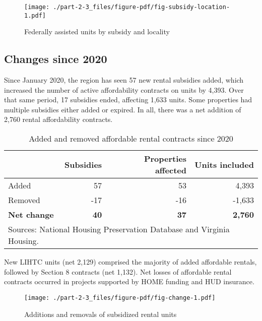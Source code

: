 \documentclass[
  letterpaper,
  DIV=11,
  numbers=noendperiod]{scrreprt}
\begin{document}
\begin{figure}

{\centering \texttt{[image: ./part-2-3\_files/figure-pdf/fig-subsidy-location-1.pdf]}

}

\caption{\label{fig-subsidy-location}Federally assisted units by subsidy
and locality}

\end{figure}

\hypertarget{changes-since-2020}{%
\subsection{Changes since 2020}\label{changes-since-2020}}

Since January 2020, the region has seen 57 new rental subsidies added,
which increased the number of active affordability contracts on units by
4,393. Over that same period, 17 subsidies ended, affecting 1,633 units.
Some properties had multiple subsidies either added or expired. In all,
there was a net addition of 2,760 rental affordability contracts.

\hypertarget{tbl-change}{}
\begin{table}
\caption{\label{tbl-change}Added and removed affordable rental contracts since 2020 }\tabularnewline

\centering
\begin{tabular}{l|r|r|r}
\hline
 & Subsidies & Properties affected & Units included\\
\hline
Added & 57 & 53 & 4,393\\
\hline
Removed & -17 & -16 & -1,633\\
\hline
\textbf{Net change} & \textbf{40} & \textbf{37} & \textbf{2,760}\\
\hline
\multicolumn{4}{l}{\rule{0pt}{1em}Sources: National Housing Preservation Database and Virginia Housing.}\\
\end{tabular}
\end{table}

New LIHTC units (net 2,129) comprised the majority of added affordable
rentals, followed by Section 8 contracts (net 1,132). Net losses of
affordable rental contracts occurred in projects supported by HOME
funding and HUD insurance.

\begin{figure}

{\centering \texttt{[image: ./part-2-3\_files/figure-pdf/fig-change-1.pdf]}

}

\caption{\label{fig-change}Additions and removals of subsidized rental
units}

\end{figure}
\end{document}
